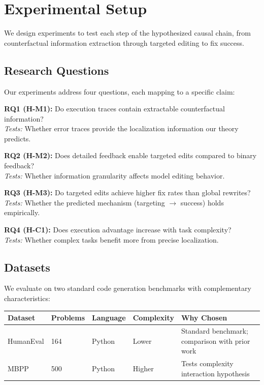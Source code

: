 \section{Experimental Setup}
\label{sec:experiments}

We design experiments to test each step of the hypothesized causal chain, from counterfactual information extraction through targeted editing to fix success.

\subsection{Research Questions}

Our experiments address four questions, each mapping to a specific claim:

\textbf{RQ1 (H-M1):} Do execution traces contain extractable counterfactual information?\\
\emph{Tests:} Whether error traces provide the localization information our theory predicts.

\textbf{RQ2 (H-M2):} Does detailed feedback enable targeted edits compared to binary feedback?\\
\emph{Tests:} Whether information granularity affects model editing behavior.

\textbf{RQ3 (H-M3):} Do targeted edits achieve higher fix rates than global rewrites?\\
\emph{Tests:} Whether the predicted mechanism (targeting $\rightarrow$ success) holds empirically.

\textbf{RQ4 (H-C1):} Does execution advantage increase with task complexity?\\
\emph{Tests:} Whether complex tasks benefit more from precise localization.

\subsection{Datasets}

We evaluate on two standard code generation benchmarks with complementary characteristics:

\begin{table}[h]
\centering
\begin{tabular}{lllll}
\toprule
\textbf{Dataset} & \textbf{Problems} & \textbf{Language} & \textbf{Complexity} & \textbf{Why Chosen} \\
\midrule
HumanEval & 164 & Python & Lower & Standard benchmark; comparison with prior work \\
MBPP & 500 & Python & Higher & Tests complexity interaction hypothesis \\
\bottomrule
\end{tabular}
\end{table}

